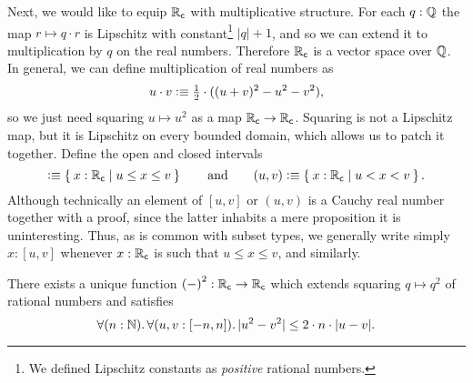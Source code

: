 %
Next, we would like to equip $\mathbb{R}_\mathsf{c}$ with multiplicative structure. For each $q : \mathbb{Q}$ the
map $r \mapsto q \cdot r$ is Lipschitz with constant\footnote{We defined Lipschitz
  constants as \emph{positive} rational numbers.} $|q| + 1$, and so we can extend it to
multiplication by $q$ on the real numbers. Therefore $\mathbb{R}_\mathsf{c}$ is a vector space over $\mathbb{Q}$.
In general, we can define multiplication of real numbers as
%
\begin{equation}
  u \cdot v \defeq
  {\textstyle \frac{1}{2}} \cdot ((u + v)^2 - u^2 - v^2),\label{mult-from-square}
\end{equation}
%
so we just need squaring $u \mapsto u^2$ as a map $\mathbb{R}_\mathsf{c} \to \mathbb{R}_\mathsf{c}$. Squaring is not a
Lipschitz map, but it is Lipschitz on every bounded domain, which allows us to patch it
together. Define the open and closed intervals
%
%
%
%
\begin{equation*}
  [u,v] \defeq \setof{ x : \RC | u \leq x \leq v }
  \qquad\text{and}\qquad
  (u,v) \defeq \setof{ x : \RC | u < x < v }.
\end{equation*}
%
Although technically an element of $[u,v]$ or $(u,v)$ is a Cauchy real number together with a proof, since the latter inhabits a mere proposition it is uninteresting.
Thus, as is common with subset types, we generally write simply $x:[u,v]$ whenever $x:\mathbb{R}_\mathsf{c}$ is such that $u\leq x \leq v$, and similarly.

\begin{thm} \label{RC-squaring}
  There exists a unique function ${(-)}^2 : \mathbb{R}_\mathsf{c} \to \mathbb{R}_\mathsf{c}$ which extends squaring $q \mapsto
  q^2$ of rational numbers and satisfies
  \begin{equation*}
    \fall{n : \N}
    \fall{u, v : [-n, n]}
    |u^2 - v^2| \leq 2 \cdot n \cdot |u - v|.
  \end{equation*}
\end{thm}

